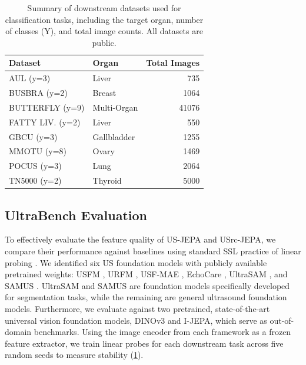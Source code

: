 \documentclass{article}
\theoremstyle{plain}
\theoremstyle{definition}
\theoremstyle{remark}
\begin{document}
\begin{table}[t]
  \caption{Summary of downstream datasets used for classification tasks, including the target organ, number of classes (Y), and total image counts. All datasets are public.}
  \label{downstream-table}
  \begin{center}
    \begin{small}
      \begin{sc}
        \begin{tabular}{llr}
          \toprule
          Dataset & Organ & Total Images \\
          \midrule
          AUL (y=3)         & Liver    & 735   \\
          BUSBRA (y=2)      & Breast      & 1064  \\
          BUTTERFLY (y=9)   & Multi-Organ & 41076 \\
          FATTY LIV. (y=2) & Liver       & 550   \\
          GBCU (y=3)        & Gallbladder & 1255  \\
          MMOTU (y=8)       & Ovary       & 1469  \\
          POCUS (y=3)       & Lung        & 2064  \\
          TN5000 (y=2)      & Thyroid     & 5000  \\
          \bottomrule
        \end{tabular}
      \end{sc}
    \end{small}
  \end{center}
  \vskip -0.1in
\end{table}

\subsection{UltraBench Evaluation}

To effectively evaluate the feature quality of US-JEPA and USrc-JEPA, we compare their performance against baselines using standard SSL practice of linear probing \cite{alain_understanding_2018}. We identified six US foundation models with publicly available pretrained weights: USFM \cite{jiao_usfm_2024}, URFM \cite{kang_urfm_2025}, USF-MAE \cite{megahed_usf-mae_2025}, EchoCare \cite{zhang_fully_2025}, UltraSAM \cite{meyer_ultrasam_2025}, and SAMUS \cite{linguraru_beyond_2024}. UltraSAM and SAMUS are foundation models specifically developed for segmentation tasks, while the remaining are general ultrasound foundation models. Furthermore, we evaluate against two pretrained, state-of-the-art universal vision foundation models, DINOv3 and I-JEPA, which serve as out-of-domain benchmarks. Using the image encoder from each framework as a frozen feature extractor, we train linear probes for each downstream task across five random seeds to measure stability (\cref{downstream-table}).
\end{document}
